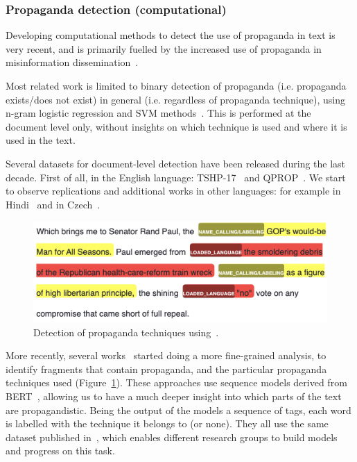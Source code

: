 \subsubsection{Propaganda detection (computational)}
\label{ssec:lit_propaganda_detection}

Developing computational methods to detect the use of propaganda in text is very recent, and is primarily fuelled by the increased use of propaganda in misinformation dissemination~\citep{da2020survey}.

Most related work is limited to binary detection of propaganda (i.e. propaganda exists/does not exist) in general (i.e. regardless of propaganda technique), using n-gram logistic regression and SVM methods~\citep{rashkin2017truth,barron2019proppy}. This is performed at the document level only, without insights on which technique is used and where it is used in the text.


Several datasets for document-level detection have been released during the last decade.
First of all, in the English language:
TSHP-17~\citep{rashkin2017truth} and
QPROP~\citep{alberto_barron_cedeno_2019_3271522}.
We start to observe replications and additional works in other languages: for example in Hindi~\citep{chaudhari2022h,chaudhari_deptii_2022_5828240}
and in Czech~\citep{baisa2019benchmark}.

\begin{figure}[!htb]
    \centering
    \includegraphics[width=\linewidth]{figures/propaganda_example_1_color.png}
    \caption{Detection of propaganda techniques using~\citet{baly2020we}.%
    }
    \label{fig:propaganda_example_1}
\end{figure}

More recently, several works~\citep{da2019fine,yoosuf2019fine,vorakitphan2022protect} started doing a more fine-grained analysis, to identify fragments that contain propaganda, and the particular propaganda techniques used (Figure~\ref{fig:propaganda_example_1}).
These approaches use sequence models derived from BERT~\citep{devlin2018bert}, allowing us to have a much deeper insight into which parts of the text are propagandistic. Being the output of the models a sequence of tags, each word is labelled with the technique it belongs to (or none).
They all use the same dataset published in~\cite{da2019fine}, which enables different research groups to build models and progress on this task.


